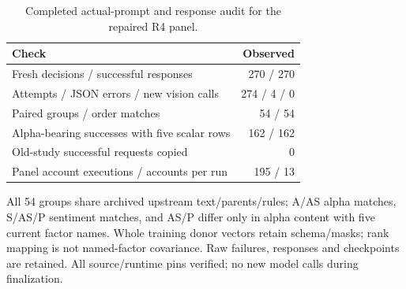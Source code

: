 \begin{table}[htbp]
\centering\small
\caption{Completed actual-prompt and response audit for the repaired R4 panel.}
\label{tab:r4_value_audit}
\setlength{\tabcolsep}{3.5pt}
\begin{tabular}{lr}
\hline
Check & Observed \\
\hline
Fresh decisions / successful responses & 270 / 270 \\
Attempts / JSON errors / new vision calls & 274 / 4 / 0 \\
Paired groups / order matches & 54 / 54 \\
Alpha-bearing successes with five scalar rows & 162 / 162 \\
Old-study successful requests copied & 0 \\
Panel account executions / accounts per run & 195 / 13 \\
\hline
\end{tabular}
\par\smallskip\footnotesize All 54 groups share archived upstream text/parents/rules; A/AS alpha matches, S/AS/P sentiment matches, and AS/P differ only in alpha content with five current factor names. Whole training donor vectors retain schema/masks; rank mapping is not named-factor covariance. Raw failures, responses and checkpoints are retained. All source/runtime pins verified; no new model calls during finalization.
\end{table}
